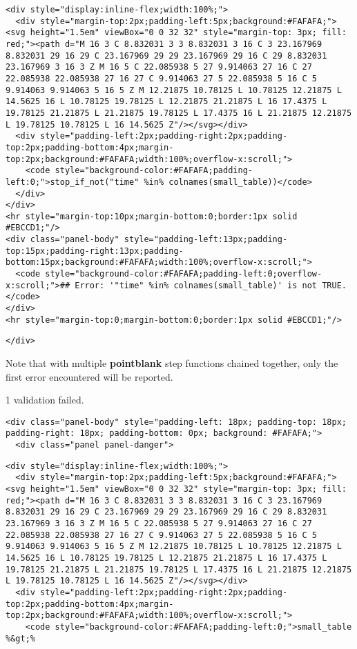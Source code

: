 \documentclass[
]{article}
\begin{document}
\begin{verbatim}
<div style="display:inline-flex;width:100%;">
  <div style="margin-top:2px;padding-left:5px;background:#FAFAFA;"><svg height="1.5em" viewBox="0 0 32 32" style="margin-top: 3px; fill: red;"><path d="M 16 3 C 8.832031 3 3 8.832031 3 16 C 3 23.167969 8.832031 29 16 29 C 23.167969 29 29 23.167969 29 16 C 29 8.832031 23.167969 3 16 3 Z M 16 5 C 22.085938 5 27 9.914063 27 16 C 27 22.085938 22.085938 27 16 27 C 9.914063 27 5 22.085938 5 16 C 5 9.914063 9.914063 5 16 5 Z M 12.21875 10.78125 L 10.78125 12.21875 L 14.5625 16 L 10.78125 19.78125 L 12.21875 21.21875 L 16 17.4375 L 19.78125 21.21875 L 21.21875 19.78125 L 17.4375 16 L 21.21875 12.21875 L 19.78125 10.78125 L 16 14.5625 Z"/></svg></div>
  <div style="padding-left:2px;padding-right:2px;padding-top:2px;padding-bottom:4px;margin-top:2px;background:#FAFAFA;width:100%;overflow-x:scroll;">
    <code style="background-color:#FAFAFA;padding-left:0;">stop_if_not("time" %in% colnames(small_table))</code>
  </div>
</div>
<hr style="margin-top:10px;margin-bottom:0;border:1px solid #EBCCD1;"/>
<div class="panel-body" style="padding-left:13px;padding-top:15px;padding-right:13px;padding-bottom:15px;background:#FAFAFA;width:100%;overflow-x:scroll;">
  <code style="background-color:#FAFAFA;padding-left:0;overflow-x:scroll;">## Error: '"time" %in% colnames(small_table)' is not TRUE.</code>
</div>
<hr style="margin-top:0;margin-bottom:0;border:1px solid #EBCCD1;"/>
\end{verbatim}

\begin{verbatim}
</div>
\end{verbatim}

Note that with multiple \textbf{pointblank} step functions chained
together, only the first error encountered will be reported.

{1 validation failed.}

\hypertarget{chunk-3326955}{}
\begin{verbatim}
<div class="panel-body" style="padding-left: 18px; padding-top: 18px; padding-right: 18px; padding-bottom: 0px; background: #FAFAFA;">
  <div class="panel panel-danger">
\end{verbatim}

\begin{verbatim}
<div style="display:inline-flex;width:100%;">
  <div style="margin-top:2px;padding-left:5px;background:#FAFAFA;"><svg height="1.5em" viewBox="0 0 32 32" style="margin-top: 3px; fill: red;"><path d="M 16 3 C 8.832031 3 3 8.832031 3 16 C 3 23.167969 8.832031 29 16 29 C 23.167969 29 29 23.167969 29 16 C 29 8.832031 23.167969 3 16 3 Z M 16 5 C 22.085938 5 27 9.914063 27 16 C 27 22.085938 22.085938 27 16 27 C 9.914063 27 5 22.085938 5 16 C 5 9.914063 9.914063 5 16 5 Z M 12.21875 10.78125 L 10.78125 12.21875 L 14.5625 16 L 10.78125 19.78125 L 12.21875 21.21875 L 16 17.4375 L 19.78125 21.21875 L 21.21875 19.78125 L 17.4375 16 L 21.21875 12.21875 L 19.78125 10.78125 L 16 14.5625 Z"/></svg></div>
  <div style="padding-left:2px;padding-right:2px;padding-top:2px;padding-bottom:4px;margin-top:2px;background:#FAFAFA;width:100%;overflow-x:scroll;">
    <code style="background-color:#FAFAFA;padding-left:0;">small_table %&gt;% 
\end{verbatim}
\end{document}

